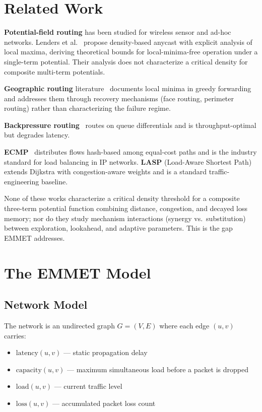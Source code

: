 \documentclass[11pt,a4paper]{article}
\begin{document}
\section{Related Work}

\textbf{Potential-field routing} has been studied for wireless sensor
and ad-hoc networks. Lenders et al.~\cite{lenders2008} propose
density-based anycast with explicit analysis of local maxima, deriving
theoretical bounds for local-minima-free operation under a single-term
potential. Their analysis does not characterize a critical density for
composite multi-term potentials.

\textbf{Geographic routing} literature~\cite{karp2000gpsr} documents
local minima in greedy forwarding and addresses them through recovery
mechanisms (face routing, perimeter routing) rather than characterizing
the failure regime.

\textbf{Backpressure routing}~\cite{tassiulas1992} routes on queue
differentials and is throughput-optimal but degrades latency.

\textbf{ECMP}~\cite{rfc2992} distributes flows hash-based among
equal-cost paths and is the industry standard for load balancing in
IP networks. \textbf{LASP} (Load-Aware Shortest Path) extends Dijkstra
with congestion-aware weights and is a standard traffic-engineering
baseline.

None of these works characterize a critical density threshold for a
composite three-term potential function combining distance, congestion,
and decayed loss memory; nor do they study mechanism interactions
(synergy vs.\ substitution) between exploration, lookahead, and
adaptive parameters. This is the gap EMMET addresses.

\section{The EMMET Model}

\subsection{Network Model}

The network is an undirected graph $G = (V, E)$ where each edge
$(u,v)$ carries:
\begin{itemize}[itemsep=1pt]
  \item $\mathrm{latency}(u,v)$ --- static propagation delay
  \item $\mathrm{capacity}(u,v)$ --- maximum simultaneous load before
        a packet is dropped
  \item $\mathrm{load}(u,v)$ --- current traffic level
  \item $\mathrm{loss}(u,v)$ --- accumulated packet loss count
\end{itemize}
\end{document}
